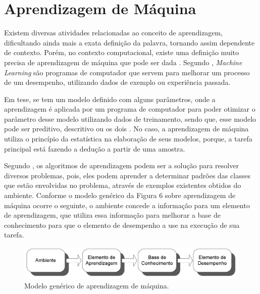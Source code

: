 \section{Aprendizagem de Máquina}

\par
Existem diversas atividades relacionadas ao conceito de aprendizagem, dificultando ainda mais a exata definição da palavra, tornando assim dependente de contexto. Porém, no contexto computacional, existe uma definição muito precisa de aprendizagem de máquina que pode ser dada \cite{Henke2011}. Segundo , \textit{Machine Learning} são programas de computador que servem para melhorar um processo de um desempenho, utilizando dados de exemplo ou experiência passada.

\par
Em tese, se tem um modelo definido com alguns parâmetros, onde a aprendizagem é aplicada por um programa de computador para poder otimizar o parâmetro desse modelo utilizando dados de treinamento, sendo que, esse modelo pode ser preditivo, descritivo ou os dois \cite{Alpaydin2009}. No caso, a aprendizagem de máquina utiliza o princípio da estatística na elaboração de seus modelos, porque, a tarefa principal está fazendo a dedução a partir de uma amostra. 

\par
Segundo , os algoritmos de aprendizagem podem ser a solução para resolver diversos problemas, pois, eles podem aprender a determinar padrões das classes que estão envolvidas no problema, através de exemplos existentes obtidos do ambiente. Conforme o modelo genérico da Figura 6 sobre aprendizagem de máquina ocorre o seguinte, o ambiente concede a informação para um elemento de aprendizagem, que utiliza essa informação para melhorar a base de conhecimento para que o elemento de desempenho a use na execução de sua tarefa. 

\begin{figure}[!htp]
	\begin{center}
    \caption{\label{fig:waveform_fig} Modelo genérico de aprendizagem de máquina.}
	\includegraphics[scale=0.45]{Figuras/Modelo_Machine_Learning.png}
	\end{center}
\end{figure}

